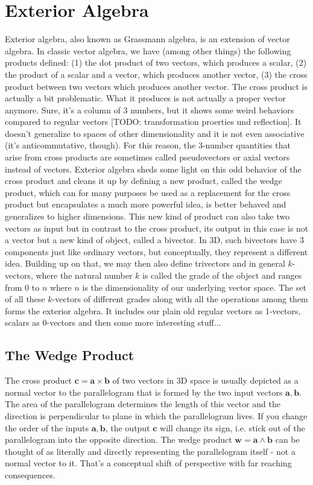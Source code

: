 \section{Exterior Algebra}
Exterior algebra, also known as Grassmann algebra, is an extension of vector algebra. In classic vector algebra, we have (among other things) the following products defined: (1) the dot product of two vectors, which produces a scalar, (2) the product of a scalar and a vector, which produces another vector, (3) the cross product between two vectors which produces another vector. The cross product is actually a bit problematic. What it produces is not actually a proper vector anymore. Sure, it's a column of 3 numbers, but it shows some weird behaviors compared to regular vectors [TODO: transformation proerties und reflection]. It doesn't generalize to spaces of other dimensionality and it is not even associative (it's anticommutative, though). For this reason, the 3-number quantities that arise from cross products are sometimes called pseudovectors or axial vectors instead of vectors. Exterior algebra sheds some light on this odd behavior of the cross product and cleans it up by defining a new product, called the wedge product, which can for many purposes be used as a replacement for the cross product but encapsulates a much more powerful idea, is better behaved and generalizes to higher dimensions. This new kind of product can also take two vectors as input but in contrast to the cross product, its output in this case is not a vector but a new kind of object, called a bivector. In 3D, such bivectors have 3 components just like ordinary vectors, but conceptually, they represent a different idea. Building up on that, we may then also define trivectors and in general $k$-vectors, where the natural number $k$ is called the grade of the object and ranges from $0$ to $n$ where $n$ is the dimensionality of our underlying vector space. The set of all these $k$-vectors of different grades along with all the operations among them forms the exterior algebra. It includes our plain old regular vectors as 1-vectors, scalars as 0-vectors and then some more interesting stuff...

\subsection{The Wedge Product}
The cross product $\mathbf{c = a \times b}$ of two vectors in 3D space is usually depicted as a normal vector to the parallelogram that is formed by the two input vectors $\mathbf{a,b}$. The area of the parallelogram determines the length of this vector and the direction is perpendicular to plane in which the parallelogram lives. If you change the order of the inputs $\mathbf{a,b}$, the output  $\mathbf{c}$ will change its sign, i.e. stick out of the parallelogram into the opposite direction. The wedge product $\mathbf{w = a \wedge b}$ can be thought of as literally and directly representing the parallelogram itself - not a normal vector to it. That's a conceptual shift of perspective with far reaching consequences. 

